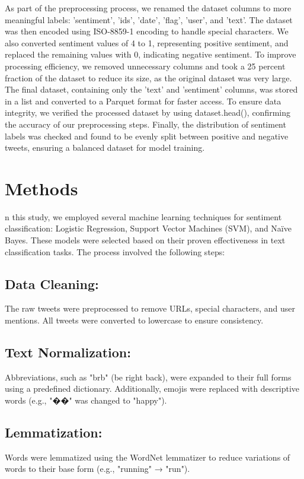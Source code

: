 \documentclass[conference]{IEEEtran}
\begin{document}
As part of the preprocessing process, we renamed the dataset columns to more meaningful labels: 'sentiment', 'ids', 'date', 'flag', 'user', and 'text'. 
The dataset was then encoded using ISO-8859-1 encoding to handle special characters. We also converted sentiment values of 4 to 1, representing positive sentiment, 
and replaced the remaining values with 0, indicating negative sentiment. To improve processing efficiency, we removed unnecessary columns and took a 25 percent
fraction of the dataset to reduce its size, as the original dataset was very large. The final dataset, containing only the 'text' and 'sentiment' columns, was 
stored in a list and converted to a Parquet format for faster access. To ensure data integrity, we verified the processed dataset by using dataset.head(), 
confirming the accuracy of our preprocessing steps. Finally, the distribution of sentiment labels was checked and found to be evenly split between positive 
and negative tweets, ensuring a balanced dataset for model training.
\section{Methods}
n this study, we employed several machine learning techniques for sentiment classification: Logistic Regression, Support Vector Machines (SVM),
 and Naïve Bayes. These models were selected based on their proven effectiveness in text classification tasks. The process involved the following steps:

   \subsection{Data Cleaning:} 
    The raw tweets were preprocessed to remove URLs, special characters, and user mentions. All tweets were converted to lowercase to ensure consistency.

    \subsection{Text Normalization:}
    Abbreviations, such as "brb" (be right back), were expanded to their full forms using a predefined dictionary. Additionally, emojis were replaced with descriptive words (e.g., "��" was changed to "happy").

    \subsection{Lemmatization:}
    Words were lemmatized using the WordNet lemmatizer to reduce variations of words to their base form (e.g., "running" → "run").
\end{document}
